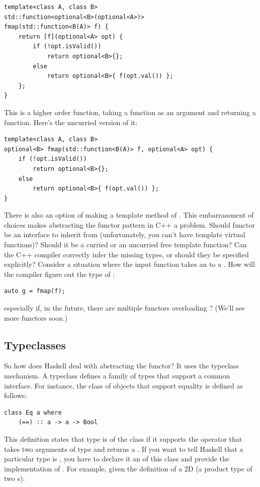 \begin{Verbatim}
template<class A, class B>
std::function<optional<B>(optional<A>)>
fmap(std::function<B(A)> f) { 
    return [f](optional<A> opt) { 
        if (!opt.isValid()) 
            return optional<B>{};
        else 
            return optional<B>{ f(opt.val()) };
    };
}
\end{Verbatim}
This is a higher order function, taking a function as an argument and
returning a function. Here's the uncurried version of it:

\begin{Verbatim}
template<class A, class B>
optional<B> fmap(std::function<B(A)> f, optional<A> opt) { 
    if (!opt.isValid())
        return optional<B>{};
    else 
        return optional<B>{ f(opt.val()) };
}
\end{Verbatim}
There is also an option of making  a template method of
. This embarrassment of choices makes abstracting the
functor pattern in C++ a problem. Should functor be an interface to
inherit from (unfortunately, you can't have template virtual functions)?
Should it be a curried or an uncurried free template function? Can the
C++ compiler correctly infer the missing types, or should they be
specified explicitly? Consider a situation where the input function
 takes an  to a . How will the
compiler figure out the type of :

\begin{Verbatim}
auto g = fmap(f);
\end{Verbatim}
especially if, in the future, there are multiple functors overloading
? (We'll see more functors soon.)

\subsection{Typeclasses}

So how does Haskell deal with abstracting the functor? It uses the
typeclass mechanism. A typeclass defines a family of types that support
a common interface. For instance, the class of objects that support
equality is defined as follows:

\begin{Verbatim}
class Eq a where
    (==) :: a -> a -> Bool
\end{Verbatim}
This definition states that type  is of the class 
if it supports the operator \code{(==)} that takes two arguments of
type  and returns a . If you want to tell Haskell
that a particular type is , you have to declare it an
 of this class and provide the implementation of
\code{(==)}. For example, given the definition of a 2D 
(a product type of two s):

